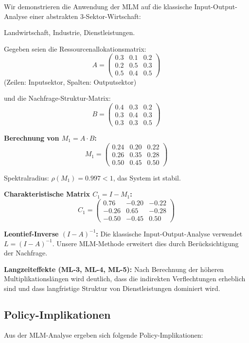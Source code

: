 \documentclass[a4paper,12pt]{article}
\theoremstyle{definition}
\begin{document}
Wir demonstrieren die Anwendung der MLM auf die klassische Input-Output-Analyse einer abstrakten 3-Sektor-Wirtschaft:

Landwirtschaft, Industrie, Dienstleistungen.

Gegeben seien die Ressourcenallokationsmatrix:
\[
A = \begin{pmatrix}
0.3 & 0.1 & 0.2 \\
0.2 & 0.5 & 0.3 \\
0.5 & 0.4 & 0.5
\end{pmatrix}
\]
(Zeilen: Inputsektor, Spalten: Outputsektor)

und die Nachfrage-Struktur-Matrix:
\[
B = \begin{pmatrix}
0.4 & 0.3 & 0.2 \\
0.3 & 0.4 & 0.3 \\
0.3 & 0.3 & 0.5
\end{pmatrix}
\]

\textbf{Berechnung von $M_1 = A \cdot B$:}
\[
M_1 = \begin{pmatrix}
0.24 & 0.20 & 0.22 \\
0.26 & 0.35 & 0.28 \\
0.50 & 0.45 & 0.50
\end{pmatrix}
\]

Spektralradius: $\rho(M_1) = 0.997 < 1$, das System ist stabil.

\textbf{Charakteristische Matrix $C_1 = I - M_1$:}
\[
C_1 = \begin{pmatrix}
0.76 & -0.20 & -0.22 \\
-0.26 & 0.65 & -0.28 \\
-0.50 & -0.45 & 0.50
\end{pmatrix}
\]

\textbf{Leontief-Inverse $(I - A)^{-1}$:}
Die klassische Input-Output-Analyse verwendet $L = (I - A)^{-1}$. Unsere MLM-Methode erweitert dies durch Berücksichtigung der Nachfrage.

\textbf{Langzeiteffekte (ML-3, ML-4, ML-5):}
Nach Berechnung der höheren Multiplikationslängen wird deutlich, dass die indirekten Verflechtungen erheblich sind und dass langfristige Struktur von Dienstleistungen dominiert wird.

\subsection{Policy-Implikationen}

Aus der MLM-Analyse ergeben sich folgende Policy-Implikationen:
\end{document}
